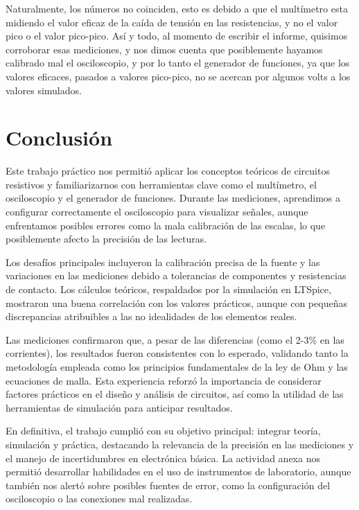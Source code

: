 \documentclass[a4paper,12pt, spanish]{report}
\begin{document}
      Naturalmente, los números no coinciden, esto es debido a que el multímetro esta midiendo el valor eficaz de la
      caída de tensión en las resistencias, y no el valor pico o el valor pico-pico. Así y todo, al momento de escribir
      el informe, quisimos corroborar esas mediciones, y nos dimos cuenta que posiblemente hayamos calibrado mal el
      osciloscopio, y por lo tanto el generador de funciones, ya que los valores eficaces, pasados a valores pico-pico,
      no se acercan por algunos volts a los valores simulados.

    \chapter{Conclusión}
      Este trabajo práctico nos permitió aplicar los conceptos teóricos de circuitos resistivos y familiarizarnos con
      herramientas clave como el multímetro, el osciloscopio y el generador de funciones. Durante las mediciones,
      aprendimos a configurar correctamente el osciloscopio para visualizar señales, aunque enfrentamos posibles
      errores como la mala calibración de las escalas, lo que posiblemente afecto la precisión de las lecturas.

      Los desafíos principales incluyeron la calibración precisa de la fuente y las variaciones en las mediciones
      debido a tolerancias de componentes y resistencias de contacto. Los cálculos teóricos, respaldados por la
      simulación en LTSpice, mostraron una buena correlación con los valores prácticos, aunque con pequeñas
      discrepancias atribuibles a las no idealidades de los elementos reales.

      Las mediciones confirmaron que, a pesar de las diferencias (como el 2-3\% en las corrientes), los resultados
      fueron consistentes con lo esperado, validando tanto la metodología empleada como los principios fundamentales
      de la ley de Ohm y las ecuaciones de malla. Esta experiencia reforzó la importancia de considerar factores
      prácticos en el diseño y análisis de circuitos, así como la utilidad de las herramientas de simulación para
      anticipar resultados.

      En definitiva, el trabajo cumplió con su objetivo principal: integrar teoría, simulación y práctica, destacando
      la relevancia de la precisión en las mediciones y el manejo de incertidumbres en electrónica básica. La actividad
      anexa nos permitió desarrollar habilidades en el uso de instrumentos de laboratorio, aunque también nos alertó
      sobre posibles fuentes de error, como la configuración del osciloscopio o las conexiones mal realizadas.
\end{document}
